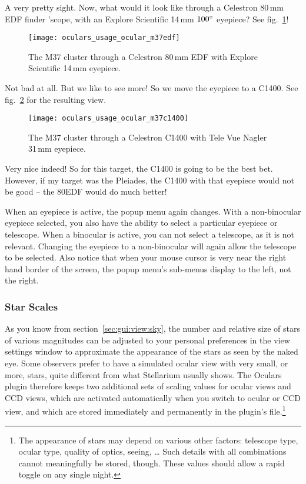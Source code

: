\noindent A very pretty sight. Now, what would it look like through a Celestron 80\,mm EDF finder 'scope, with an Explore Scientific 14\,mm $100\degree$ eyepiece? See fig.~\ref{fig:plugins:Oculars:Usage:Ocular:M37EDF}!

\begin{figure}[h]\centering
\texttt{[image: oculars\_usage\_ocular\_m37edf]}
\caption{The M37 cluster through a Celestron 80\,mm EDF with Explore Scientific 14\,mm eyepiece.}
\label{fig:plugins:Oculars:Usage:Ocular:M37EDF}
\end{figure}

\noindent Not bad at all. But we like to see more! So we move the eyepiece to a C1400. See fig.~\ref{fig:plugins:Oculars:Usage:Ocular:M37C1400} for the resulting view.


\begin{figure}[ht]\centering
\texttt{[image: oculars\_usage\_ocular\_m37c1400]}
\caption{The M37 cluster through a Celestron C1400 with Tele Vue Nagler 31\,mm eyepiece.}
\label{fig:plugins:Oculars:Usage:Ocular:M37C1400}
\end{figure}

Very nice indeed! So for this target, the C1400 is going to be the best bet. However, if my target was the Pleiades, the C1400 with that eyepiece would not be good -- the 80EDF would do much better!

When an eyepiece is active, the popup menu again changes.  
With a non-binocular eyepiece selected, you also have the ability to select a particular eyepiece or telescope.
When a binocular is active, you can not select a telescope, as it is not relevant. 
Changing the eyepiece to a non-binocular will again allow the telescope to be selected. 
Also notice that when your mouse cursor is very near the right hand border of the screen, the popup menu's sub-menus display to the left, not the right.

\subsubsection{Star Scales}
As you know from section~\ref{sec:gui:view:sky}, the number and relative size of stars of various magnitudes 
can be adjusted to your personal preferences in the view settings window to approximate the appearance of the stars as seen by the naked eye. 
Some observers prefer to have a simulated ocular view with very small, or more, stars, quite different from what Stellarium usually shows. 
The Oculars plugin therefore keeps two additional sets of scaling values for ocular views and CCD views, which are activated 
automatically when you switch to ocular or CCD view, and which are stored immediately and permanently in the plugin's  file.\footnote{%
The appearance of stars may depend on various other factors: telescope type, ocular type, quality of optics, seeing, \ldots 
Such details with all combinations cannot meaningfully be stored, though. These values should allow a rapid toggle on any single night.}

